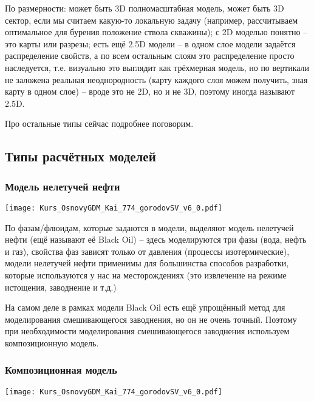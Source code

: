 \documentclass[main.tex]{subfiles}
\begin{document}
По размерности: может быть 3D полномасштабная модель, может быть 3D сектор, если мы считаем какую-то локальную задачу (например, рассчитываем оптимальное для бурения положение ствола скважины); с 2D моделью понятно -- это карты или разрезы; есть ещё 2.5D модели -- в одном слое модели задаётся распределение свойств, а по всем остальным слоям это распределение просто наследуется, т.е. визуально это выглядит как трёхмерная модель, но по вертикали не заложена реальная неоднородность (карту каждого слоя можем получить, зная карту в одном слое) -- вроде это не 2D, но и не 3D, поэтому иногда называют 2.5D.

Про остальные типы сейчас подробнее поговорим.

\subsection{Типы расчётных моделей}

\subsubsection{Модель нелетучей нефти}

\texttt{[image: Kurs\_OsnovyGDM\_Kai\_774\_gorodovSV\_v6\_0.pdf]}

По фазам/флюидам, которые задаются в модели, выделяют модель нелетучей нефти (ещё называют её Black Oil) -- здесь моделируются три фазы (вода, нефть и газ), свойства фаз зависят только от давления (процессы изотермические), модели нелетучей нефти применимы для большинства способов разработки, которые используются у нас на месторождениях (это извлечение на режиме истощения, заводнение и т.д.)

На самом деле в рамках модели Black Oil есть ещё упрощённый метод для моделирования смешивающегося заводнения, но он не очень точный.
Поэтому при необходимости моделирования смешивающегося заводнения используем композиционную модель.

\subsubsection{Композиционная модель}

\texttt{[image: Kurs\_OsnovyGDM\_Kai\_774\_gorodovSV\_v6\_0.pdf]}
\end{document}
